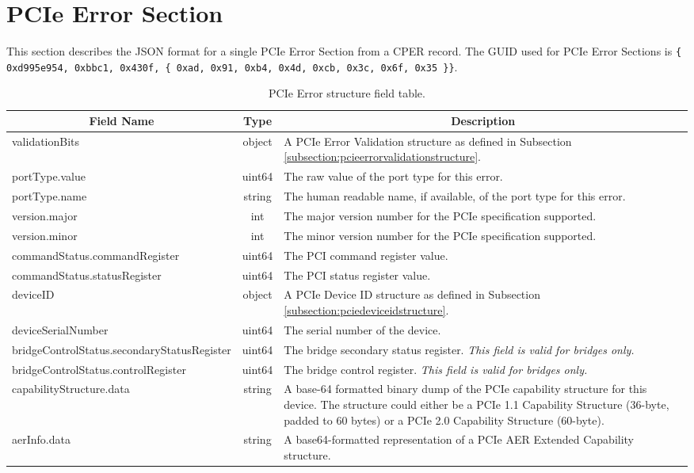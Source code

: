 \documentclass{report}
\newcommand*{\thead}[1]{\multicolumn{1}{|c|}{\bfseries #1}}
\newcommand*{\jsontable}[1]{
    \begin{table}[!ht]
    \label{#1}
    \centering
    \begin{adjustbox}{center}
    \begin{tabular}{|l|c|p{8cm}|}
    \hline
    \thead{Field Name} & \thead{Type} & \thead{Description} \\
    \hline
}
\newcommand*{\jsontableend}[1]{
    \hline
    \end{tabular}
    \end{adjustbox}
    \caption{#1}
    \label{table:#1}
    \end{table}
    \FloatBarrier
}
\begin{document}
\section{PCIe Error Section}
\label{section:pcieerrorsection}
This section describes the JSON format for a single PCIe Error Section from a CPER record. The GUID used for PCIe Error Sections is \texttt{\{ 0xd995e954, 0xbbc1, 0x430f, \{ 0xad, 0x91, 0xb4, 0x4d, 0xcb, 0x3c, 0x6f, 0x35 \}\}}.
\jsontable{table:pcieerrorsection}
validationBits & object & A PCIe Error Validation structure as defined in Subsection \ref{subsection:pcieerrorvalidationstructure}.\\
\hline
portType.value & uint64 & The raw value of the port type for this error.\\
portType.name & string & The human readable name, if available, of the port type for this error.\\
\hline
version.major & int & The major version number for the PCIe specification supported.\\
version.minor & int & The minor version number for the PCIe specification supported.\\
\hline
commandStatus.commandRegister & uint64 & The PCI command register value.\\
commandStatus.statusRegister & uint64 & The PCI status register value.\\
\hline
deviceID & object & A PCIe Device ID structure as defined in Subsection \ref{subsection:pciedeviceidstructure}.\\
\hline
deviceSerialNumber & uint64 & The serial number of the device.\\
\hline
bridgeControlStatus.secondaryStatusRegister & uint64 & The bridge secondary status register. \emph{This field is valid for bridges only.}\\
\hline
bridgeControlStatus.controlRegister & uint64 & The bridge control register. \emph{This field is valid for bridges only.}\\
\hline
capabilityStructure.data & string & A base-64 formatted binary dump of the PCIe capability structure for this device. The structure could either be a PCIe 1.1 Capability Structure (36-byte, padded to 60 bytes) or a PCIe 2.0 Capability Structure (60-byte).\\
\hline
aerInfo.data & string & A base64-formatted representation of a PCIe AER Extended Capability structure.\\
\jsontableend{PCIe Error structure field table.}
\end{document}
